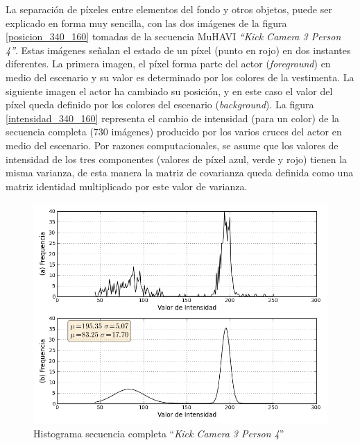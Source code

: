 La separación de píxeles entre elementos del fondo y otros objetos, puede ser explicado en forma muy sencilla, con las dos imágenes de la figura \ref{posicion_340_160} tomadas de la secuencia MuHAVI \textit{``Kick Camera 3 Person 4''}\cite{singh_muhavi_2010}. Estas imágenes señalan el estado de un píxel (punto en rojo) en dos instantes diferentes. La primera imagen, el píxel forma parte del actor (\textit{foreground}) en medio del escenario y su valor es determinado por los colores de la vestimenta. La siguiente imagen el actor ha cambiado su posición, y en este caso el valor del píxel queda definido por los colores del escenario (\textit{background}). La figura \ref{intensidad_340_160} representa el cambio de intensidad (para un color) de la secuencia completa (730 imágenes) producido por los varios cruces del actor en medio del escenario. Por razones computacionales, se asume que los valores de intensidad de los tres componentes (valores de píxel azul, verde y rojo) tienen la misma varianza\cite{zivkovic_efficient_2006}, de esta manera la matriz de covarianza queda definida como una matriz identidad multiplicado por este valor de varianza.

\begin{figure}[h!]
  \centering
      \includegraphics[scale=0.75]{img/histograma_pixel_340_160_3_2}
  \caption[Histograma secuencia completa ``\textit{Kick Camera 3 Person 4}'']{Histograma secuencia completa ``\textit{Kick Camera 3 Person 4}''}
\label{histograma}
\end{figure}

